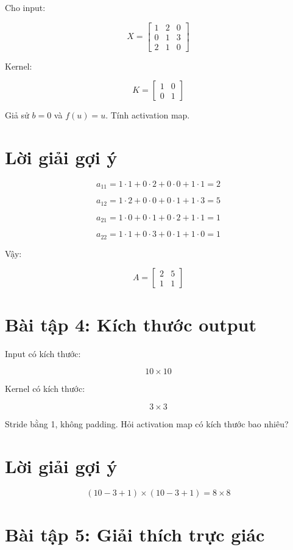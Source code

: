 \documentclass[12pt,a4paper]{report}
\begin{document}
Cho input:

\[
    X =
    \begin{bmatrix}
    1 & 2 & 0\\
    0 & 1 & 3\\
    2 & 1 & 0
    \end{bmatrix}
\]

Kernel:

\[
    K =
    \begin{bmatrix}
    1 & 0\\
    0 & 1
    \end{bmatrix}
\]

Giả sử $b=0$ và $f(u)=u$. Tính activation map.

\section*{Lời giải gợi ý}

\[
    a_{11}=1\cdot1+0\cdot2+0\cdot0+1\cdot1=2
\]

\[
    a_{12}=1\cdot2+0\cdot0+0\cdot1+1\cdot3=5
\]

\[
    a_{21}=1\cdot0+0\cdot1+0\cdot2+1\cdot1=1
\]

\[
    a_{22}=1\cdot1+0\cdot3+0\cdot1+1\cdot0=1
\]

Vậy:

\[
    A =
    \begin{bmatrix}
    2 & 5\\
    1 & 1
    \end{bmatrix}
\]

\section*{Bài tập 4: Kích thước output}

Input có kích thước:

\[
    10\times10
\]

Kernel có kích thước:

\[
    3\times3
\]

Stride bằng 1, không padding. Hỏi activation map có kích thước bao nhiêu?

\section*{Lời giải gợi ý}

\[
    (10-3+1)\times(10-3+1)=8\times8
\]

\section*{Bài tập 5: Giải thích trực giác}
\end{document}
